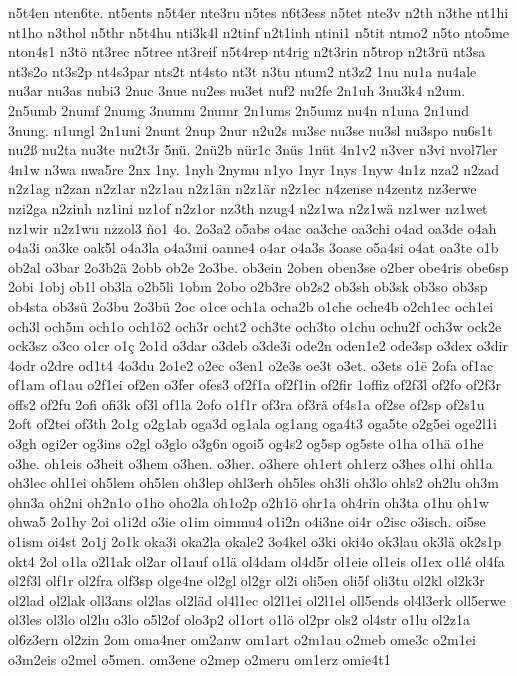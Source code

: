 {n5t4en
nten6te.
nt5ents
n5t4er
nte3ru
n5tes
n6t3ess
n5tet
nte3v
n2th
n3the
nt1hi
nt1ho
n3thol
n5thr
n5t4hu
nti3k4l
n2tinf
n2t1inh
ntini1
n5tit
ntmo2
n5to
nto5me
nton4s1
n3tö
nt3rec
n5tree
nt3reif
n5t4rep
nt4rig
n2t3rin
n5trop
n2t3rü
nt3sa
nt3s2o
nt3s2p
nt4s3par
nts2t
nt4sto
nt3t
n3tu
ntum2
nt3z2
1nu
nu1a
nu4ale
nu3ar
nu3as
nubi3
2nuc
3nue
nu2es
nu3et
nuf2
nu2fe
2n1uh
3nu3k4
n2um.
2n5umb
2numf
2numg
3numm
2numr
2n1ums
2n5umz
nu4n
n1una
2n1und
3nung.
n1ungl
2n1uni
2nunt
2nup
2nur
n2u2s
nu3sc
nu3se
nu3sl
nu3spo
nu6s1t
nu2ß
nu2ta
nu3te
nu2t3r
5nü.
2nü2b
nür1c
3nüs
1nüt
4n1v2
n3ver
n3vi
nvol7ler
4n1w
n3wa
nwa5re
2nx
1ny.
1nyh
2nymu
n1yo
1nyr
1nys
1nyw
4n1z
nza2
n2zad
n2z1ag
n2zan
n2z1ar
n2z1au
n2z1än
n2z1är
n2z1ec
n4zense
n4zentz
nz3erwe
nzi2ga
n2zinh
nz1ini
nz1of
n2z1or
nz3th
nzug4
n2z1wa
n2z1wä
nz1wer
nz1wet
nz1wir
n2z1wu
nzzol3
ño1
4o.
2o3a2
o5abs
o4ac
oa3che
oa3chi
o4ad
oa3de
o4ah
o4a3i
oa3ke
oak5l
o4a3la
o4a3mi
oanne4
o4ar
o4a3s
3oase
o5a4si
o4at
oa3te
o1b
ob2al
o3bar
2o3b2ä
2obb
ob2e
2o3be.
ob3ein
2oben
oben3se
o2ber
obe4ris
obe6sp
2obi
1obj
ob1l
ob3la
o2b5li
1obm
2obo
o2b3re
ob2s2
ob3sh
ob3sk
ob3so
ob3sp
ob4sta
ob3sü
2o3bu
2o3bü
2oc
o1ce
och1a
ocha2b
o1che
oche4b
o2ch1ec
och1ei
och3l
och5m
och1o
och1ö2
och3r
ocht2
och3te
och3to
o1chu
ochu2f
och3w
ock2e
ock3sz
o3co
o1cr
o1ç
2o1d
o3dar
o3deb
o3de3i
ode2n
oden1e2
ode3sp
o3dex
o3dir
4odr
o2dre
od1t4
4o3du
2o1e2
o2ec
o3en1
o2e3s
oe3t
o3et.
o3ets
o1ë
2ofa
of1ac
of1am
of1au
o2f1ei
of2en
o3fer
ofes3
of2f1a
of2f1in
of2fir
1offiz
of2f3l
of2fo
of2f3r
offs2
of2fu
2ofi
ofi3k
of3l
of1la
2ofo
o1f1r
of3ra
of3rä
of4s1a
of2se
of2sp
of2s1u
2oft
of2tei
of3th
2o1g
o2g1ab
oga3d
og1ala
og1ang
oga4t3
oga5te
o2g5ei
oge2l1i
o3gh
ogi2er
og3ins
o2gl
o3glo
o3g6n
ogoi5
og4s2
og5sp
og5ste
o1ha
o1hä
o1he
o3he.
oh1eis
o3heit
o3hem
o3hen.
o3her.
o3here
oh1ert
oh1erz
o3hes
o1hi
ohl1a
oh3lec
ohl1ei
oh5lem
oh5len
oh3lep
ohl3erh
oh5les
oh3li
oh3lo
ohls2
oh2lu
oh3m
ohn3a
oh2ni
oh2n1o
o1ho
oho2la
oh1o2p
o2h1ö
ohr1a
oh4rin
oh3ta
o1hu
oh1w
ohwa5
2o1hy
2oi
o1i2d
o3ie
o1im
oimmu4
o1i2n
o4i3ne
oi4r
o2isc
o3isch.
oi5se
o1ism
oi4st
2o1j
2o1k
oka3i
oka2la
okale2
3o4kel
o3ki
oki4o
ok3lau
ok3lä
ok2s1p
okt4
2ol
o1la
o2l1ak
ol2ar
ol1auf
o1lä
ol4dam
ol4d5r
ol1eie
ol1eis
ol1ex
o1lé
ol4fa
ol2f3l
olf1r
ol2fra
olf3sp
olge4ne
ol2gl
ol2gr
ol2i
oli5en
oli5f
oli3tu
ol2kl
ol2k3r
ol2lad
ol2lak
oll3ans
ol2las
ol2läd
ol4l1ec
ol2l1ei
ol2l1el
oll5ends
ol4l3erk
oll5erwe
ol3les
ol3lo
ol2lu
o3lo
o5l2of
olo3p2
ol1ort
o1lö
ol2pr
ols2
ol4str
o1lu
ol2z1a
ol6z3ern
ol2zin
2om
oma4ner
om2anw
om1art
o2m1au
o2meb
ome3c
o2m1ei
o3m2eis
o2mel
o5men.
om3ene
o2mep
o2meru
om1erz
omie4t1
}
